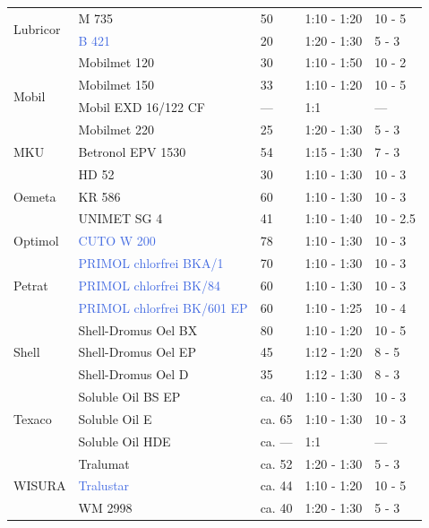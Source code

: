 \begin{longtable}{|p{3.5cm}|p{4.5cm}|p{1.5cm}|p{2.7cm}|p{2cm}|}
    \multirow{2}{*}{Lubricor} & M 735 & 50 & 1:10 - 1:20 & 10 - 5 \\
    \cline{2-5}
    & \textcolor{RoyalBlue}{B 421} & 20 & 1:20 - 1:30 & 5 - 3 \\
    \hline

    \multirow{4}{*}{Mobil} & Mobilmet 120 & 30 & 1:10 - 1:50 & 10 - 2 \\
    \cline{2-5}
    & Mobilmet 150 & 33 & 1:10 - 1:20 & 10 - 5 \\
    \cline{2-5}
    & Mobil EXD 16/122 CF & --- & 1:1 & --- \\
    \cline{2-5}
    & Mobilmet 220 & 25 & 1:20 - 1:30 & 5 - 3 \\
    \hline

    \multirow{1}{*}{MKU} & Betronol EPV 1530 & 54 & 1:15 - 1:30 & 7 - 3 \\
    \hline

    \multirow{3}{*}{Oemeta} & HD 52 & 30 & 1:10 - 1:30 & 10 - 3 \\
    \cline{2-5}
    & KR 586 & 60 & 1:10 - 1:30 & 10 - 3 \\
    \cline{2-5}
    & UNIMET SG 4 & 41 & 1:10 - 1:40 & 10 - 2.5 \\
    \hline

    \multirow{1}{*}{Optimol} & \textcolor{RoyalBlue}{CUTO W 200} & 78 & 1:10 - 1:30 & 10 - 3 \\
    \hline

    \multirow{3}{*}{Petrat} & \textcolor{RoyalBlue}{PRIMOL chlorfrei BKA/1} & 70 & 1:10 - 1:30 & 10 - 3 \\
    \cline{2-5}
    & \textcolor{RoyalBlue}{PRIMOL chlorfrei BK/84} & 60 & 1:10 - 1:30 & 10 - 3 \\
    \cline{2-5}
    & \textcolor{RoyalBlue}{PRIMOL chlorfrei BK/601 EP} & 60 & 1:10 - 1:25 & 10 - 4 \\
    \hline

    \multirow{3}{*}{Shell} & Shell-Dromus Oel BX & 80 & 1:10 - 1:20 & 10 - 5 \\
    \cline{2-5}
    & Shell-Dromus Oel EP & 45 & 1:12 - 1:20 & 8 - 5 \\
    \cline{2-5}
    & Shell-Dromus Oel D & 35 & 1:12 - 1:30 & 8 - 3 \\
    \hline

    \multirow{3}{*}{Texaco} & Soluble Oil BS EP & ca. 40 & 1:10 - 1:30 & 10 - 3 \\
    \cline{2-5}
    & Soluble Oil E & ca. 65 & 1:10 - 1:30 & 10 - 3 \\
    \cline{2-5}
    & Soluble Oil HDE & ca. --- & 1:1 & --- \\
    \hline
    \multirow{3}{*}{WISURA} & Tralumat & ca. 52 & 1:20 - 1:30 & 5 - 3 \\
    \cline{2-5}
    & \textcolor{RoyalBlue}{Tralustar} & ca. 44 & 1:10 - 1:20 & 10 - 5 \\
    \cline{2-5}
    & WM 2998 & ca. 40 & 1:20 - 1:30 & 5 - 3 \\
    \hline
\end{longtable}

